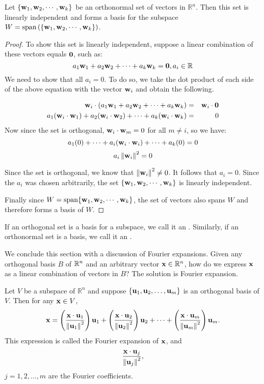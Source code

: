 \documentclass{ximera}
\begin{document}
\begin{theorem}\label{orthbasis}
Let $ \{ {\bf w}_1, {\bf w}_2, \cdots, {\bf w}_k \}$ be an
orthonormal set of vectors in $\mathbb{R}^n$. Then this set is
linearly independent and forms a basis for the subspace $W =
\mbox{span}\left( \{ {\bf w}_1, {\bf w}_2, \cdots, {\bf w}_k \}\right)$.
\end{theorem}

\begin{proof}
To show this set is linearly independent, suppose a linear combination
of these vectors equals ${\bf 0}$, such as:
\[
a_1 {\bf w}_1 + a_2 {\bf w}_2 + \cdots + a_k {\bf w}_k = {\bf 0}, a_i \in \mathbb{R}
\]
We need to show that all $a_i = 0$. To do so, we take the dot product of
each side of the above equation with the vector ${\bf w}_i$ and obtain the following.

\begin{eqnarray*}
{\bf w}_i \cdot (a_1 {\bf w}_1 + a_2 {\bf w}_2 + \cdots + a_k {\bf w}_k ) &=& {\bf w}_i \cdot {\bf 0}\\
a_1 ({\bf w}_i \cdot {\bf w}_1) + a_2 ({\bf w}_i \cdot {\bf w}_2) + \cdots + a_k ({\bf w}_i \cdot {\bf w}_k)  &=& 0
\end{eqnarray*}
Now since the set is orthogonal, ${\bf w}_i \cdot {\bf w}_m = 0$ for all $m \neq i$, so we have:
\[
a_1 (0) + \cdots + a_i({\bf w}_i \cdot {\bf w}_i) + \cdots + a_k (0) = 0
\]
\[
a_i \left\lVert{\bf w}_i\right\rVert^2 = 0
\]

Since the set is orthogonal, we know that $\left\lVert{\bf w}_i\right\rVert^2  \neq 0$. It follows that $a_i =0$. Since the $a_i$ was chosen arbitrarily, the set $\{ {\bf w}_1, {\bf w}_2, \cdots, {\bf w}_k \}$ is linearly independent.

Finally since $W = \mbox{span} \{ {\bf w}_1, {\bf w}_2, \cdots,
{\bf w}_k \}$, the set of vectors also spans $W$ and therefore forms a basis of $W$.

\end{proof}

If an orthogonal set is a basis for a subspace, we call it an
. Similarly, if an orthonormal set is a basis, we call it an .

We conclude this section with a discussion of Fourier expansions. Given any orthogonal basis $B$ of $\mathbb{R}^n$ and an arbitrary vector ${\bf x} \in \mathbb{R}^n$, how do we express ${\bf x}$ as a linear combination of vectors in $B$? The solution is Fourier expansion.

\begin{theorem}\label{fourierexpansion}
Let $V$ be a subspace of $\mathbb{R}^n$ and suppose $\{ {\bf u}_1, {\bf u}_2, \ldots, {\bf u}_m \}$
is an orthogonal basis of $V$.
Then for any ${\bf x}\in V$,
\[ {\bf x} =
\left(\frac{{\bf x}\cdot {\bf u}_1}{\left\lVert{\bf u}_1\right\rVert^2}\right) {\bf u}_1 +
\left(\frac{{\bf x}\cdot {\bf u}_2}{\left\lVert{\bf u}_2\right\rVert^2}\right) {\bf u}_2 +
\cdots +
\left(\frac{{\bf x}\cdot {\bf u}_m}{\left\lVert{\bf u}_m\right\rVert^2}\right) {\bf u}_m.
\]
This expression is called the Fourier expansion
of ${\bf x}$, and
\[ \frac{{\bf x}\cdot {\bf u}_j}{\left\lVert{\bf u}_j\right\rVert^2},\]
$j=1,2,\ldots,m$
are the Fourier coefficients.
\end{theorem}
\end{document}
